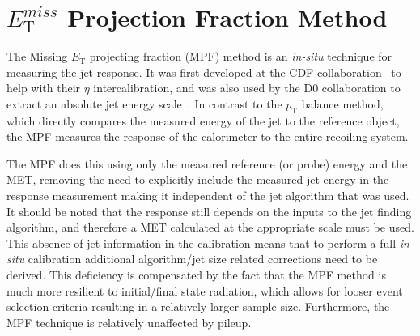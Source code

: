 \section{$E_{\mathrm T}^{miss}$ Projection Fraction Method}
\label{METProj}

The Missing $E_{\mathrm T}$ projecting fraction (MPF) method is an \textit{in-situ} technique for measuring the jet response.  
It was first developed at the CDF collaboration~\cite{abe1992dijet} to help with their $\eta$ intercalibration, and was also used by the D0 collaboration to extract an absolute jet energy scale~\cite{item/10150/186444}.  
In contrast to the $p_{\mathrm T}$ balance method, which directly compares the measured energy of the jet to the reference object, the MPF measures the response of the calorimeter to the entire recoiling system.

The MPF does this using only the measured reference (or probe) energy and the MET, removing the need to explicitly include the measured jet energy in the response measurement making it independent of the jet algorithm that was used.  
It should be noted that the response still depends on the inputs to the jet finding algorithm, and therefore a MET calculated at the appropriate scale must be used.  
This absence of jet information in the calibration means that to perform a full \textit{in-situ} calibration additional algorithm/jet size related corrections need to be derived.  
This deficiency is compensated by the fact that the MPF method is much more resilient to initial/final state radiation, which allows for looser event selection criteria resulting in a relatively larger sample size.  
Furthermore, the MPF technique is relatively unaffected by pileup.  

